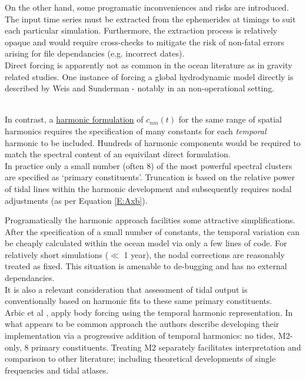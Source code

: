 On the other hand, some programatic inconveniences and risks are introduced. 
The input time series must be extracted from the ephemerides at timings to suit each particular simulation.  Furthermore, the extraction process is relatively opaque and would require cross-checks to mitigate the risk of non-fatal errors arising for file dependancies (e.g. incorrect dates).\\
Direct forcing is apparently not as common in the ocean literature as in gravity related studies.   
One instance of forcing a global hydrodynamic model directly is described by Weis and Sunderman \citep{Weis:2008ex} - notably in an non-operational setting.\\\



In contrast, a \underline{harmonic formulation} of $c_{nm}(t)$ for the same range of spatial harmonics requires the specification of many constants for each \emph{temporal} harmonic to be included.  
Hundreds of harmonic components \citep[pp3]{Desai:2006wo} would be required to match the spectral content of an equivilant direct formulation.\\

In practice only a small number (often 8) of the most powerful spectral clusters are specified as `primary constituents'.  
Truncation is based on the relative power of tidal lines within the harmonic development and subsequently requires nodal adjustments (as per Equation \ref{E:Axb}).

Programatically the harmonic approach facilities some attractive simplifications.  
After the specification of a small number of constants, the temporal variation can be cheaply calculated within the ocean model via only a few lines of code.   
For relatively short simulations ($\ll$ 1 year), the nodal corrections are reasonably treated as fixed.   This situation is amenable to de-bugging and has no external dependancies.\\
It is also a relevant consideration that assessment of tidal output is conventionally based on harmonic fits to these same primary constituents.\\

Arbic et al \citep{Arbic:2010us}, apply body forcing using the temporal harmonic representation.  In what appears to be common approach the authors describe developing their implementation via a progressive addition of temporal harmonics: no tides, M2-only, 8 primary constituents.  Treating M2 separately facilitates interpretation and comparison to other literature; including theoretical developments of single frequencies and tidal atlases.



